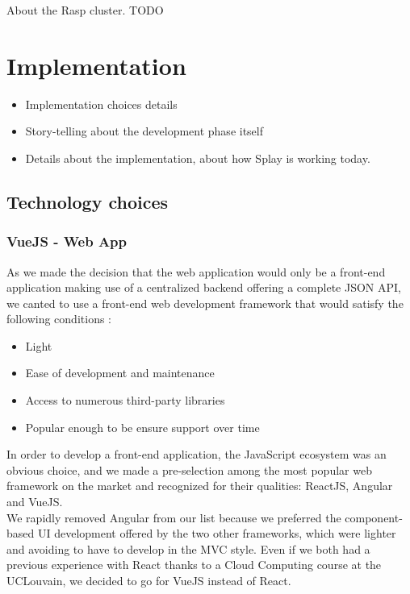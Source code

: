 \documentclass{eplmastersthesis}
\begin{document}
      About the Rasp cluster. {\color{red} TODO}



  \chapter{Implementation}

    \begin{itemize}
      \item Implementation choices details
      \item Story-telling about the development phase itself
      \item Details about the implementation, about how Splay is working today.
    \end{itemize}

    \section{Technology choices}

      \subsection{VueJS - Web App}

        As we made the decision that the web application would only be a
        front-end application making use of a centralized backend offering
        a complete JSON API, we canted to use a front-end web development
        framework that would satisfy the following conditions : \\

        \begin{itemize}
          \item Light
          \item Ease of development and maintenance
          \item Access to numerous third-party libraries
          \item Popular enough to be ensure support over time
        \end{itemize}

        In order to develop a front-end application, the JavaScript ecosystem
        was an obvious choice, and we made a pre-selection among the most
        popular web framework on the market and recognized for their qualities:
        ReactJS, Angular and VueJS.\\
        We rapidly removed Angular from our list because we preferred the
        component-based UI development offered by the two other frameworks,
        which were lighter and avoiding to have to develop in the MVC style.
        Even if we both had a previous experience with React thanks to a
        Cloud Computing course at the UCLouvain, we decided to go for VueJS
        instead of React.\\
\end{document}
